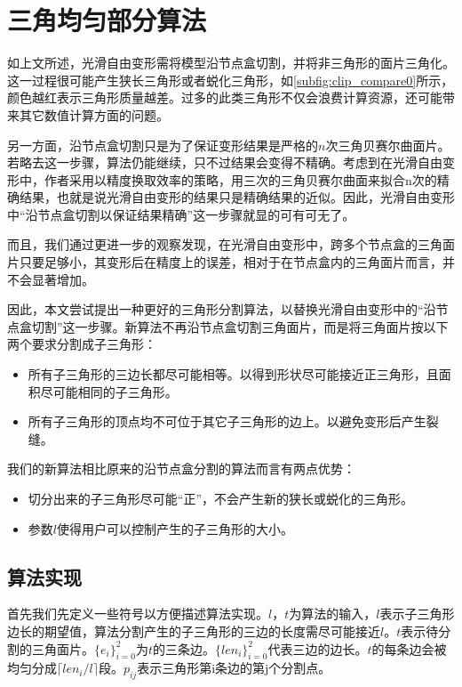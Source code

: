 
\chapter{三角均匀部分算法}
如上文所述，光滑自由变形需将模型沿节点盒切割，并将非三角形的面片三角化。这一过程很可能产生狭长三角形或者蜕化三角形，如\autoref{subfig:clip_compare0}所示，颜色越红表示三角形质量越差。过多的此类三角形不仅会浪费计算资源，还可能带来其它数值计算方面的问题。

另一方面，沿节点盒切割只是为了保证变形结果是严格的$n$次三角贝赛尔曲面片。若略去这一步骤，算法仍能继续，只不过结果会变得不精确。考虑到在光滑自由变形中，作者采用以精度换取效率的策略，用三次的三角贝赛尔曲面来拟合n次的精确结果，也就是说光滑自由变形的结果只是精确结果的近似。因此，光滑自由变形中“沿节点盒切割以保证结果精确”这一步骤就显的可有可无了。

而且，我们通过更进一步的观察发现，在光滑自由变形中，跨多个节点盒的三角面片只要足够小，其变形后在精度上的误差，相对于在节点盒内的三角面片而言，并不会显著增加。

因此，本文尝试提出一种更好的三角形分割算法，以替换光滑自由变形中的“沿节点盒切割”这一步骤。新算法不再沿节点盒切割三角面片，而是将三角面片按以下两个要求分割成子三角形：
\begin{itemize}
    \item 所有子三角形的三边长都尽可能相等。以得到形状尽可能接近正三角形，且面积尽可能相同的子三角形。
    \item 所有子三角形的顶点均不可位于其它子三角形的边上。以避免变形后产生裂缝。
\end{itemize}

我们的新算法相比原来的沿节点盒分割的算法而言有两点优势：
\begin{itemize}
        \item 切分出来的子三角形尽可能“正”，不会产生新的狭长或蜕化的三角形。
        \item 参数$l$使得用户可以控制产生的子三角形的大小。
\end{itemize}


\section{算法实现}
首先我们先定义一些符号以方便描述算法实现。$l$，$t$为算法的输入，$l$表示子三角形边长的期望值，算法分割产生的子三角形的三边的长度需尽可能接近$l$。$t$表示待分割的三角面片。$\{e_i\}^{2}_{i=0}$为$t$的三条边。$\{len_i\}^{2}_{i=0}$代表三边的边长。$t$的每条边会被均匀分成$\lceil len_i/l \rceil$段。$p_{ij}$表示三角形第i条边的第j个分割点。


